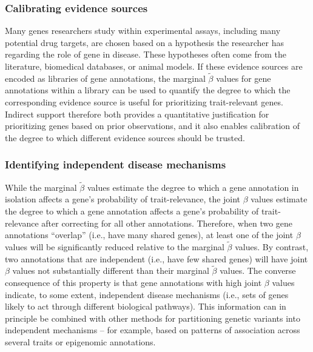 \documentclass[11pt]{article}
\begin{document}
\subsubsection{Calibrating evidence sources}
Many genes researchers study within experimental assays, including
many potential drug targets, are chosen based on a hypothesis the
researcher has regarding the role of gene in disease. These hypotheses
often come from the literature, biomedical
databases, or animal models. If these evidence sources are encoded as
libraries of gene annotations, the marginal $\tilde{\beta}$ values for gene annotations
within a library can be used to quantify the degree to which the
corresponding evidence source is useful for prioritizing
trait-relevant genes. Indirect support therefore both provides a
quantitative justification for prioritizing genes based on prior
observations, and it also enables calibration of the degree to which
different evidence sources should be trusted.

\subsubsection{Identifying independent disease mechanisms}

While the marginal $\tilde{\beta}$ values estimate the degree to which
a gene annotation in isolation affects a gene's probability of
trait-relevance, the joint $\beta$ values estimate the degree to which
a gene annotation affects a gene's probability of trait-relevance
after correcting for all other annotations. Therefore, when two gene
annotations ``overlap'' (i.e., have many shared genes), at least one
of the joint $\beta$ values will be significantly reduced relative to
the marginal $\tilde{\beta}$ values. By contrast, two annotations that
are independent (i.e., have few shared genes) will have joint $\beta$
values not substantially different than their marginal $\tilde{\beta}$
values. The converse consequence of this property is that gene
annotations with high joint $\beta$ values indicate, to some extent,
independent disease mechanisms (i.e., sets of genes likely
to act through different biological pathways). This information can in
principle be combined with other methods for partitioning genetic
variants into independent mechanisms -- for example, based on patterns
of association across several traits\cite{udler} or epigenomic annotations\cite{price}.
\end{document}
